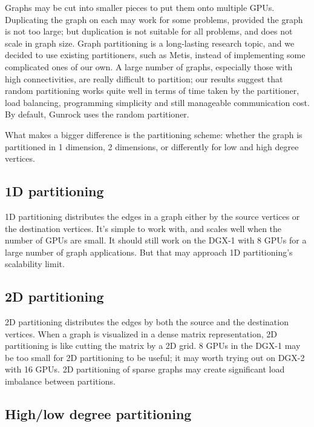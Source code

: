 \documentclass[10pt,oneside]{memoir}
\begin{document}
Graphs may be cut into smaller pieces to put them onto multiple GPUs.
Duplicating the graph on each may work for some problems, provided the
graph is not too large; but duplication is not suitable for all
problems, and does not scale in graph size. Graph partitioning is a
long-lasting research topic, and we decided to use existing
partitioners, such as Metis, instead of implementing some complicated
ones of our own. A large number of graphs, especially those with high
connectivities, are really difficult to partition; our results suggest
that random partitioning works quite well in terms of time taken by the
partitioner, load balancing, programming simplicity and still manageable
communication cost. By default, Gunrock uses the random partitioner.

What makes a bigger difference is the partitioning scheme: whether the
graph is partitioned in 1 dimension, 2 dimensions, or differently for
low and high degree vertices.

\hypertarget{d-partitioning}{%
\subsection{1D partitioning}\label{d-partitioning}}

1D partitioning distributes the edges in a graph either by the source
vertices or the destination vertices. It's simple to work with, and
scales well when the number of GPUs are small. It should still work on
the DGX-1 with 8 GPUs for a large number of graph applications. But that
may approach 1D partitioning's scalability limit.

\hypertarget{d-partitioning-1}{%
\subsection{2D partitioning}\label{d-partitioning-1}}

2D partitioning distributes the edges by both the source and the
destination vertices. When a graph is visualized in a dense matrix
representation, 2D partitioning is like cutting the matrix by a 2D grid.
8 GPUs in the DGX-1 may be too small for 2D partitioning to be useful;
it may worth trying out on DGX-2 with 16 GPUs. 2D partitioning of sparse
graphs may create significant load imbalance between partitions.

\hypertarget{highlow-degree-partitioning}{%
\subsection{High/low degree
partitioning}\label{highlow-degree-partitioning}}
\end{document}
